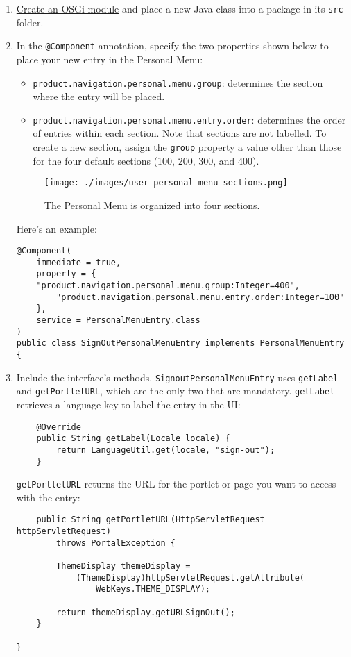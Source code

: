 \begin{enumerate}
\def\labelenumi{\arabic{enumi}.}
\item
  \href{/docs/7-2/reference/-/knowledge_base/r/creating-a-project}{Create
  an OSGi module} and place a new Java class into a package in its
  \texttt{src} folder.
\item
  In the \texttt{@Component} annotation, specify the two properties
  shown below to place your new entry in the Personal Menu:

  \begin{itemize}
  \item
    \texttt{product.navigation.personal.menu.group}: determines the
    section where the entry will be placed.
  \item
    \texttt{product.navigation.personal.menu.entry.order}: determines
    the order of entries within each section. Note that sections are not
    labelled. To create a new section, assign the \texttt{group}
    property a value other than those for the four default sections
    (100, 200, 300, and 400).
  \end{itemize}

  \begin{figure}
  \centering
  \texttt{[image: ./images/user-personal-menu-sections.png]}
  \caption{The Personal Menu is organized into four sections.}
  \end{figure}

  Here's an example:

\begin{verbatim}
@Component(
    immediate = true,
    property = {
    "product.navigation.personal.menu.group:Integer=400",
        "product.navigation.personal.menu.entry.order:Integer=100"
    },
    service = PersonalMenuEntry.class
)
public class SignOutPersonalMenuEntry implements PersonalMenuEntry {
\end{verbatim}
\item
  Include the interface's methods. \texttt{SignoutPersonalMenuEntry}
  uses \texttt{getLabel} and \texttt{getPortletURL}, which are the only
  two that are mandatory. \texttt{getLabel} retrieves a language key to
  label the entry in the UI:

\begin{verbatim}
    @Override
    public String getLabel(Locale locale) {
        return LanguageUtil.get(locale, "sign-out");
    }
\end{verbatim}

  \texttt{getPortletURL} returns the URL for the portlet or page you
  want to access with the entry:

\begin{verbatim}
    public String getPortletURL(HttpServletRequest httpServletRequest)
        throws PortalException {

        ThemeDisplay themeDisplay =
            (ThemeDisplay)httpServletRequest.getAttribute(
                WebKeys.THEME_DISPLAY);

        return themeDisplay.getURLSignOut();
    }

}
\end{verbatim}
\end{enumerate}

